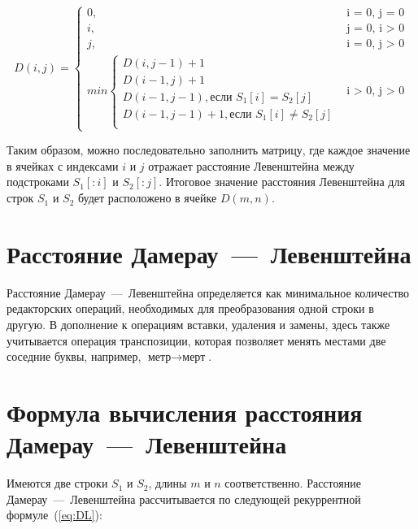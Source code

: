 \documentclass[a4paper, 12pt]{extreport}
\begin{document}
\begin{equation}
	\label{eq:L}
	D(i, j) = \begin{cases}
	0, &\text{i = 0, j = 0}\\
	i, &\text{j = 0, i > 0}\\
	j, &\text{i = 0, j > 0}\\
	min \begin{cases}
		D(i, j - 1) + 1\\
		D(i - 1, j) + 1\\
		D(i - 1, j - 1), \text{если $S_{1}[i]= S_{2}[j]$} \\
            D(i - 1, j - 1) + 1, \text{если $S_{1}[i] \neq S_{2}[j]$} \\
	\end{cases}
	&\text{i > 0, j > 0}
	\end{cases}
\end{equation}

Таким образом, можно последовательно заполнить матрицу, где каждое значение в ячейках с индексами $i$ и $j$ отражает расстояние Левенштейна между подстроками $S_{1}[:i]$ и $S_{2}[:j]$. Итоговое значение расстояния Левенштейна для строк $S_{1}$ и $S_{2}$ будет расположено в ячейке $D(m, n)$.


\section{Расстояние Дамерау~---~Левенштейна}
Расстояние Дамерау~---~Левенштейна определяется как минимальное количество редакторских операций, необходимых для преобразования одной строки в другую. В дополнение к операциям вставки, удаления и замены, здесь также учитывается операция транспозиции, которая позволяет менять местами две соседние буквы, например, $\text{метр}\rightarrow \text{мерт}$.


\section{Формула вычисления расстояния Дамерау~---~Левенштейна}

Имеются две строки $S_{1}$ и $S_{2}$, длины $m$ и $n$ соответственно. Расстояние Дамерау~---~Левенштейна рассчитывается по следующей рекуррентной формуле~(\ref{eq:DL}):
\end{document}
